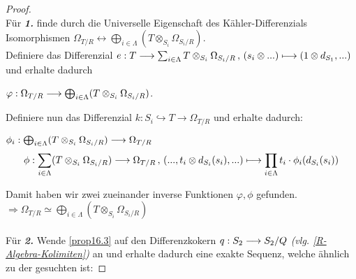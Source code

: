 \documentclass[10pt,a4paper]{report}
\newcommand{\functionfront}[3]{\nolinebreak{#1:#2 \longrightarrow #3}}
\newcommand{\function}[5]{\nolinebreak{#1:#2 \longrightarrow #3 \, , \, #4 \longmapsto #5}}
\newcommand{\divR}[2]{\Omega_{#1/#2}}
\newcommand{\divf}[1]{d_{#1}}
\newcommand{\Tensor}[3]{#1 \otimes_{#2} #3}
\newcommand{\tensor}[3]{#1 \otimes #3}
\begin{document}
\begin{proof}\ \\
Für \textit{\textbf{1.}} finde durch die Universelle Eigenschaft des Kähler-Differenzials Isomorphismen $ \divR{T}{R} \longleftrightarrow \bigoplus_{i \in \Lambda} ( \Tensor{T}{S_i}{\divR{S_i}{R}} )$.\\
Definiere das Differenzial $\function{e}{T}{\sum_{i \in \Lambda} \Tensor{T}{S_i}{\divR{S_i}{R}}}{(\tensor{s_i}{R}{...})}{(\tensor{1}{S_i}{\divf{S_1},...)}}$ und erhalte dadurch
\begin{center}
$\functionfront{\varphi}{\divR{T}{R}}{\bigoplus_{i\in \Lambda} ( \Tensor{T}{S_i}{\divR{S_i}{R}} )}$.
\end{center}
Definiere nun das Differenzial $k: S_i \hookrightarrow T \longrightarrow \divR{T}{R}$ und erhalte dadurch:
\begin{center}
$\functionfront{\phi_i}{\bigoplus_{i\in \Lambda} ( \Tensor{T}{S_i}{\divR{S_i}{R}} )}{\divR{T}{R}}$\\
\begin{gather*}
\function{\phi}{\sum_{i\in \Lambda} ( \Tensor{T}{S_i}{\divR{S_i}{R}})}{\divR{T}{R}}{(...,\tensor{t_i}{S_i}{\divf{S_i}(s_i)},...)}{\prod_{i\in \Lambda} t_i \cdot \phi_i(\divf{S_i}(s_i))}
\end{gather*}
\end{center}
Damit haben wir zwei zueinander inverse Funktionen $\varphi ,\phi$ gefunden.\\
$\Rightarrow \divR{T}{R} \simeq \bigoplus_{i\in \Lambda} ( \Tensor{T}{S_i}{\divR{S_i}{R}} )$\\
\ \\
Für \textit{\textbf{2.}} Wende \cref{prop16.3} auf den Differenzkokern $\functionfront{q}{S_2}{S_2/Q}$ \textit{(vlg. \cref{R-Algebra-Kolimiten})} an und erhalte dadurch eine exakte Sequenz, welche ähnlich zu der gesuchten ist:

\end{proof}
\end{document}
